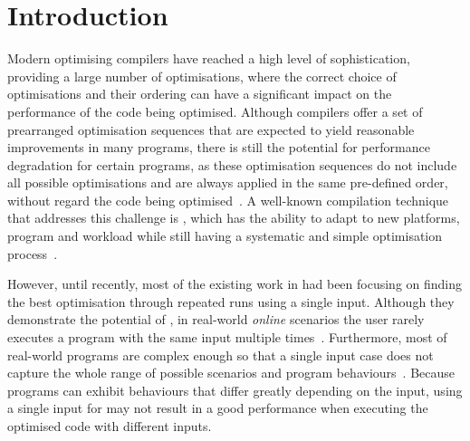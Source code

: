 \section{Introduction}

Modern optimising compilers have reached a high level of sophistication,
providing a large number of optimisations, where the correct choice of
optimisations and their ordering can have a significant impact on the
performance of the code being optimised.
Although compilers offer a set of prearranged optimisation sequences that are
expected to yield reasonable improvements in many programs, there is still the
potential for performance degradation for certain programs, as these
optimisation sequences do not include all possible optimisations and are always
applied in the same pre-defined order, without regard the code being
optimised~\cite{pan06,cavazos07,zhou12,kulkarni12}.
A well-known compilation technique that addresses this challenge is {\itercomp},
which has the ability to adapt to new platforms, program and workload while
still having a systematic and simple optimisation process~\cite{kisuki99,fursin07,chen10}.


However, until recently, most of the existing work in {\itercomp} had been focusing on
finding the best optimisation through repeated runs using a single input.
Although they demonstrate the potential of {\itercomp}, in real-world
\textit{online} scenarios the user rarely executes a program with the same input
multiple times~\cite{bodin98,kisuki99,stephenson03,kulkarni04,agakov06}.
Furthermore, most of real-world programs are complex enough so that a single
input case does not capture the whole range of possible scenarios and program
behaviours~\cite{haneda06,fursin07,chen10,chen12a}.
Because programs can exhibit behaviours that differ greatly depending on the
input, using a single input for {\itercomp} may not result in a good performance
when executing the optimised code with different inputs.

